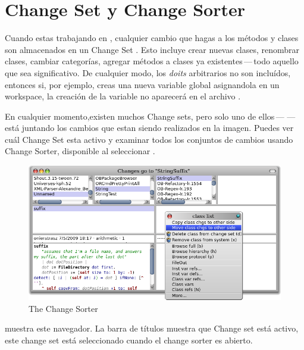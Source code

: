 \documentclass[spanish,a4paper,10pt,twoside]{book}
\begin{document}

\section{Change Set y Change Sorter}

Cuando estas trabajando en \pharo, cualquier cambio que hagas a los m\'etodos y
clases son almacenados en un Change Set . Esto incluye crear
nuevas clases, renombrar clases, cambiar categor\'ias, agregar métodos a clases
ya existentes\,---\,todo aquello que sea significativo. De cualquier modo, los
\emph{doits} arbitrarios no son inclu\'idos, entonces si, por ejemplo, creas una
nueva variable global asignandola en un workspace, la creaci\'on de la variable
no aparecer\'a en el archivo .

En cualquier momento,existen muchos Change sets, pero solo uno de
ellos\,---\,\,---\,est\'a juntando los cambios que estan
siendo realizados en la imagen. Puedes ver cu\'al Change Set esta
activo y examinar todos los conjuntos de cambios usando Change Sorter, disponible al seleccionar .

\begin{figure}[btp]
	\begin{center}
		\includegraphics[width=\linewidth]{changeSorter}
	\end{center}
	\caption{The Change Sorter}
\end{figure}

 muestra este navegador.  La barra de t\'itulos muestra que
Change set est\'a activo, este change set est\'a seleccionado cuando el change
sorter es abierto.
\end{document}
